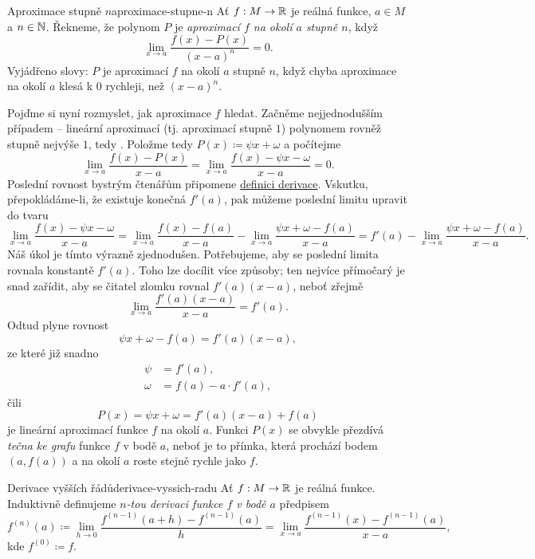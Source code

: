 \begin{definition}{Aproximace stupně $n$}{aproximace-stupne-n}
 Ať $f:M \to \mathbb{R}$ je reálná funkce, $a \in M$ a $n \in \mathbb{N}$. Řekneme, že polynom
 $P$ je \emph{aproximací $f$ na okolí $a$ stupně $n$}, když
 \[
  \lim_{x \to a} \frac{f(x) - P(x)}{(x-a)^{n}} = 0.
 \]
 Vyjádřeno slovy: $P$ je aproximací $f$ na okolí $a$ stupně $n$, když chyba
 aproximace na okolí $a$ klesá k $0$ rychleji, než $(x-a)^{n}$.
\end{definition}

Pojďme si nyní rozmyslet, jak aproximace $f$ hledat. Začněme nejjednodušším
případem -- lineární aproximací (tj. aproximací stupně $1$) polynomem rovněž
stupně nejvýše $1$, tedy . Položme tedy $P(x) \coloneqq \psi x +
\omega$ a počítejme
\[
 \lim_{x \to a} \frac{f(x) - P(x)}{x - a} = \lim_{x \to a} \frac{f(x) - \psi x -
 \omega}{x - a} = 0.
\]
Poslední rovnost bystrým čtenářům připomene \hyperref[def:derivace]{definici
derivace}. Vskutku, přepokládáme-li, že existuje konečná $f'(a)$, pak můžeme
poslední limitu upravit do tvaru
\[
 \lim_{x \to a} \frac{f(x) - \psi x - \omega}{x - a} = \lim_{x \to a} \frac{f(x)
 - f(a)}{x-a} - \lim_{x \to a} \frac{\psi x + \omega - f(a)}{x-a} = f'(a) -
 \lim_{x \to a} \frac{\psi x + \omega - f(a)}{x - a}.
\]
Náš úkol je tímto výrazně zjednodušen. Potřebujeme, aby se poslední limita
rovnala konstantě $f'(a)$. Toho lze docílit více způsoby; ten nejvíce přímočarý
je snad zařídit, aby se čitatel zlomku rovnal $f'(a)(x-a)$, neboť zřejmě
\[
 \lim_{x \to a} \frac{f'(a)(x-a)}{x-a} = f'(a).
\]
Odtud plyne rovnost
\[
 \psi x + \omega - f(a) = f'(a)(x-a),
\]
ze které již snadno
\begin{align*}
 \psi &= f'(a),\\
 \omega &= f(a) - a \cdot f'(a),
\end{align*}
čili
\[
 P(x) = \psi x + \omega = f'(a)(x - a) + f(a)
\]
je lineární aproximací funkce $f$ na okolí $a$. Funkci $P(x)$ se obvykle
přezdívá \emph{tečna ke grafu} funkce $f$ v bodě $a$, neboť je to přímka, která
prochází bodem $(a,f(a))$ a na okolí $a$ roste stejně rychle jako $f$.

\begin{definition}{Derivace vyšších řádů}{derivace-vyssich-radu}
 Ať $f:M \to \mathbb{R}$ je reálná funkce. Induktivně definujeme \emph{$n$-tou derivaci
 funkce $f$ v bodě $a$} předpisem
 \[
  f^{(n)}(a) \coloneqq \lim_{h \to 0} \frac{f^{(n-1)}(a + h) - f^{(n -
  1)}(a)}{h} = \lim_{x \to a} \frac{f^{(n-1)}(x) - f^{(n-1)}(a)}{x-a},
 \]
 kde $f^{(0)} \coloneqq f$.
\end{definition}

